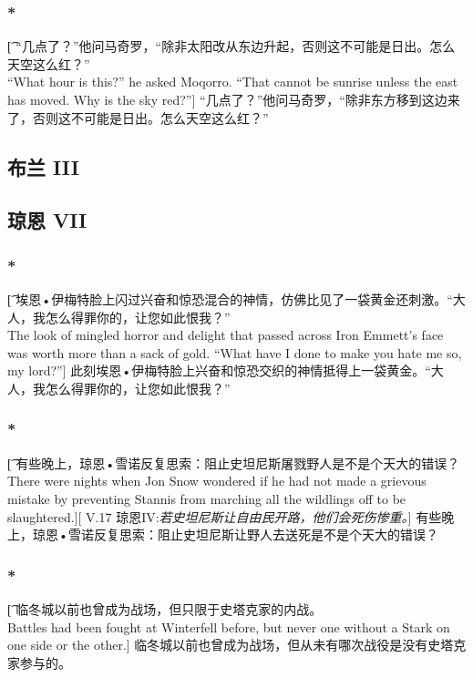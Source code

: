 \documentclass[12pt,a4paper]{article}
\begin{document}
\subsubsection{\color{red}*}\t[
	“几点了？”他问马奇罗，“除非太阳改从东边升起，否则这不可能是日出。怎么天空这么红？”\\
	“What hour is this?” he asked Moqorro. “That cannot be sunrise unless the east has moved. Why is the sky red?”]
	“几点了？”他问马奇罗，“除非东方移到这边来了，否则这不可能是日出。怎么天空这么红？”
		
\subsection{布兰 III}

\subsection{琼恩 VII}
\subsubsection{\color{red}*}\t[
	埃恩•伊梅特脸上闪过兴奋和惊恐混合的神情，仿佛比见了一袋黄金还刺激。“大人，我怎么得罪你的，让您如此恨我？”\\
	The look of mingled horror and delight that passed across Iron Emmett's face was worth more than a sack of gold. “What have I done to make you hate me so, my lord?”]
	此刻埃恩•伊梅特脸上兴奋和惊恐交织的神情抵得上一袋黄金。“大人，我怎么得罪你的，让您如此恨我？”

\subsubsection{\color{red}*}\t[
	有些晚上，琼恩•雪诺反复思索：阻止史坦尼斯屠戮野人是不是个天大的错误？\\
	There were nights when Jon Snow wondered if he had not made a grievous mistake by preventing Stannis from marching all the wildlings off to be slaughtered.][
	V.17 琼恩IV:\emph{若史坦尼斯让自由民开路，他们会死伤惨重。}]
	有些晚上，琼恩•雪诺反复思索：阻止史坦尼斯让野人去送死是不是个天大的错误？
	
\subsubsection{\color{red}*}\t[
	临冬城以前也曾成为战场，但只限于史塔克家的内战。\\
	Battles had been fought at Winterfell before, but never one without a Stark on one side or the other.]
	临冬城以前也曾成为战场，但从未有哪次战役是没有史塔克家参与的。
	
\end{document}
